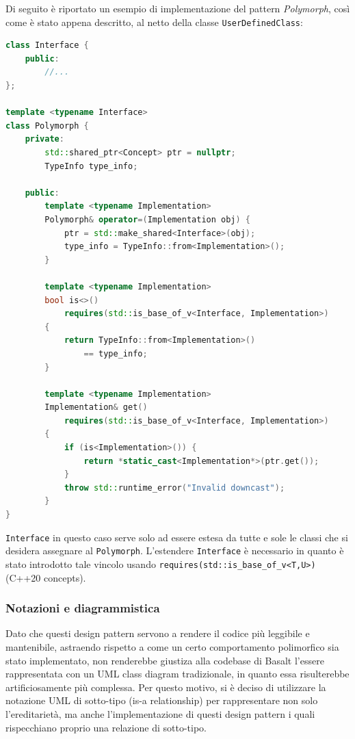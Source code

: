 \newpage

Di seguito è riportato un esempio di implementazione del pattern \textit{Polymorph}, così come è stato appena descritto,
al netto della classe \texttt{UserDefinedClass}: \\

\vspace{0.5cm}
\begin{lstlisting}[language=C++, frame=single]
class Interface {
    public:
        //...
};

template <typename Interface>
class Polymorph {
    private:
        std::shared_ptr<Concept> ptr = nullptr;
        TypeInfo type_info;

    public:
        template <typename Implementation>
        Polymorph& operator=(Implementation obj) {
            ptr = std::make_shared<Interface>(obj);
            type_info = TypeInfo::from<Implementation>();
        }

        template <typename Implementation>
        bool is<>() 
            requires(std::is_base_of_v<Interface, Implementation>)
        { 
            return TypeInfo::from<Implementation>() 
                == type_info; 
        }

        template <typename Implementation>
        Implementation& get() 
            requires(std::is_base_of_v<Interface, Implementation>)
        {
            if (is<Implementation>()) {
                return *static_cast<Implementation*>(ptr.get());
            }
            throw std::runtime_error("Invalid downcast");
        }
}
\end{lstlisting}
\vspace{0.5cm}

\texttt{Interface} in questo caso serve solo ad essere estesa da tutte e sole le classi che si desidera 
assegnare al \texttt{Polymorph}. L'estendere \texttt{Interface} è necessario in quanto è stato 
introdotto tale vincolo usando \texttt{requires(std::is\_base\_of\_v<T,U>)} (C++20 concepts).

\newpage

\subsubsection{Notazioni e diagrammistica}
Dato che questi design pattern servono a rendere il codice più leggibile e mantenibile, astraendo rispetto 
a come un certo comportamento polimorfico sia stato implementato, non renderebbe giustiza alla codebase di Basalt 
l'essere rappresentata con un UML class diagram tradizionale, in quanto essa risulterebbe artificiosamente più complessa. Per 
questo motivo, si è deciso di utilizzare la notazione UML di sotto-tipo (is-a relationship) per rappresentare
non solo l'ereditarietà, ma anche l'implementazione di questi design pattern i quali rispecchiano proprio una 
relazione di sotto-tipo. \\

